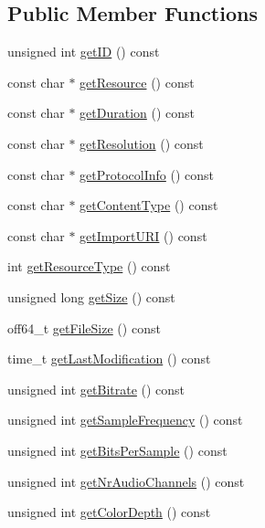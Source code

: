 \subsection*{Public Member Functions}
\begin{CompactItemize}
\item 
unsigned int \hyperlink{classcUPnPResource_47ad15c119fbcfdda1bc5f60d0a3efc9}{getID} () const 
\item 
const char $\ast$ \hyperlink{classcUPnPResource_b648a88993b0e5a4421514f45a5b266f}{getResource} () const 
\item 
const char $\ast$ \hyperlink{classcUPnPResource_5da7e39c5fc76f5607c232319daa135c}{getDuration} () const 
\item 
const char $\ast$ \hyperlink{classcUPnPResource_27d5140dc72a8e034ce197913d6aa1d5}{getResolution} () const 
\item 
const char $\ast$ \hyperlink{classcUPnPResource_0ff5e61a2d07873ae2ebdab7d87b3d9f}{getProtocolInfo} () const 
\item 
const char $\ast$ \hyperlink{classcUPnPResource_6aeaaf476c5d6548b15bb381c032b815}{getContentType} () const 
\item 
const char $\ast$ \hyperlink{classcUPnPResource_04ab0d214e39ddfa18339926cef9fd64}{getImportURI} () const 
\item 
int \hyperlink{classcUPnPResource_6b6855ba6d4bd06805750ede92449c8d}{getResourceType} () const 
\item 
unsigned long \hyperlink{classcUPnPResource_361f6991a29dddf575a2b0b63ce5a66a}{getSize} () const 
\item 
off64\_\-t \hyperlink{classcUPnPResource_5cabb363c4fd0785d3f073011df835e9}{getFileSize} () const 
\item 
time\_\-t \hyperlink{classcUPnPResource_c95a8fe0bdba2c371a46e4e267dab1aa}{getLastModification} () const 
\item 
unsigned int \hyperlink{classcUPnPResource_3f2f3d5c447fee28d3dff5cf739e4c98}{getBitrate} () const 
\item 
unsigned int \hyperlink{classcUPnPResource_5ea6003b282c48f575bc54f5c9658ca9}{getSampleFrequency} () const 
\item 
unsigned int \hyperlink{classcUPnPResource_3efd82888fd648dd08b5d43520638d17}{getBitsPerSample} () const 
\item 
unsigned int \hyperlink{classcUPnPResource_ff18e089f421d710580292f0b91b40f8}{getNrAudioChannels} () const 
\item 
unsigned int \hyperlink{classcUPnPResource_276eddcc28bad31d6178cf109373074a}{getColorDepth} () const 
\end{CompactItemize}
